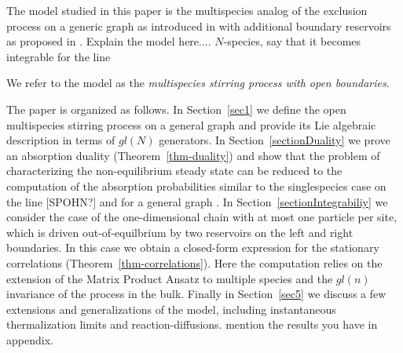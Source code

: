 \documentclass[10pt]{article}
\numberwithin{equation}{section}
\numberwithin{equation}{subsection}
\begin{document}
The model studied in this paper is the multispecies analog of the exclusion process on a generic graph as introduced in \cite{zhou2021orthogonal} with additional boundary reservoirs as proposed in \cite{vanicat2017exact}.
{\color{red}Explain the model here.... $N$-species, say that it becomes integrable for the line }

We refer to the model as the {\em  multispecies stirring process with open boundaries}.
%

The  paper is organized as follows.
In Section~\ref{sec1} we define the open multispecies stirring
process on a general graph and provide its Lie algebraic description in terms of $gl(N)$ generators. In Section~\ref{sectionDuality} we prove an absorption duality (Theorem~\ref{thm-duality})
and show that the problem of characterizing the non-equilibrium
steady state can be reduced to the computation of the absorption probabilities similar to the singlespecies case on the line [SPOHN?] and for a general graph \cite{ frassek2020duality}. 
In Section~\ref{sectionIntegrabiliy}  we consider  the case of the one-dimensional chain with at most one 
particle per site, which is driven out-of-equilbrium by two reservoirs on the left and right boundaries. In this case we obtain a closed-form expression for the stationary correlations (Theorem~\ref{thm-correlations}). Here the computation
relies on the extension of the  Matrix Product Ansatz \cite{derrida1993exact} to multiple species \cite{vanicat2017exact} and the $gl(n)$ invariance of the process in the bulk. Finally in Section~\ref{sec5} we discuss a few extensions 
and generalizations of the model, including instantaneous thermalization limits and reaction-diffusions. {\color{red} mention the results you have in appendix}.




\end{document}
